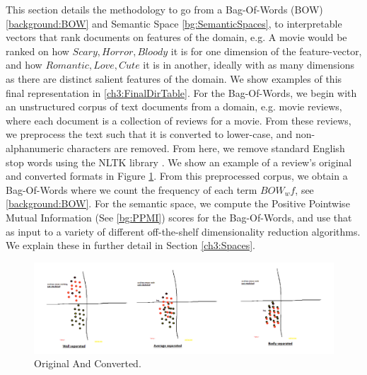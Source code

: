 This section details the methodology to go from a Bag-Of-Words (BOW) \ref{background:BOW} and Semantic Space \ref{bg:SemanticSpaces}, to interpretable vectors that rank documents on features of the domain, e.g. A movie would be ranked on how ${Scary, Horror, Bloody}$ it is for one dimension of the feature-vector, and how ${Romantic, Love, Cute}$ it is in another, ideally with as many dimensions as there are distinct salient features of the domain. 
We show examples of this final representation in \ref{ch3:FinalDirTable}. For the Bag-Of-Words, we begin with an unstructured corpus of text documents from a domain, e.g. movie reviews, where each document is a collection of reviews for a movie. From these reviews, we preprocess the text such that it is converted to lower-case, and non-alphanumeric characters are removed. From here, we remove standard English stop words using the NLTK library \cite{Bird}. We show an example of a review's original and converted formats in Figure \ref{ch3:OrigAndConverted}. From this preprocessed corpus, we obtain a Bag-Of-Words where we count the frequency of each term $BOW_wf$, see \ref{background:BOW}. For the semantic space, we compute the Positive Pointwise Mutual Information (See \ref{bg:PPMI}) scores for the Bag-Of-Words, and use that as input to a variety of different off-the-shelf dimensionality reduction algorithms. We explain these in further detail in Section \ref{ch3:Spaces}. 

\begin{figure}[t]
	\includegraphics[width=\textwidth]{images/genres_separated.png}
	\centering
	\caption{Original And Converted.}\label{ch3:OrigAndConverted}
\end{figure}

